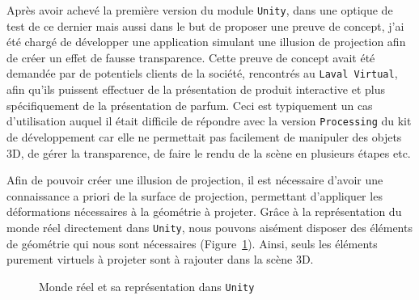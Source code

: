 Après avoir achevé la première version du module \texttt{Unity}, dans une optique de test de ce dernier mais aussi dans le but de proposer une preuve de concept, j'ai été chargé de développer une application simulant une illusion de projection afin de créer un effet de fausse transparence. Cette preuve de concept avait été demandée par de potentiels clients de la société, rencontrés au \texttt{Laval Virtual}, afin qu'ils puissent effectuer de la présentation de produit interactive et plus spécifiquement de la présentation de parfum. Ceci est typiquement un cas d'utilisation auquel il était difficile de répondre avec la version \texttt{Processing} du kit de développement car elle ne permettait pas facilement de manipuler des objets 3D, de gérer la transparence, de faire le rendu de la scène en plusieurs étapes etc. 

Afin de pouvoir créer une illusion de projection, il est nécessaire d'avoir une connaissance a priori de la surface de projection, permettant d'appliquer les déformations nécessaires à la géométrie à projeter. Grâce à la représentation du monde réel directement dans \texttt{Unity}, nous pouvons aisément disposer des éléments de géométrie qui nous sont nécessaires (Figure~\ref{fig:realvsunity}). Ainsi, seuls les éléments purement virtuels à projeter sont à rajouter dans la scène 3D.

\begin{figure}[H]
\centering
\caption{Monde réel et sa représentation dans \texttt{Unity}}
\label{fig:realvsunity}
\end{figure}

